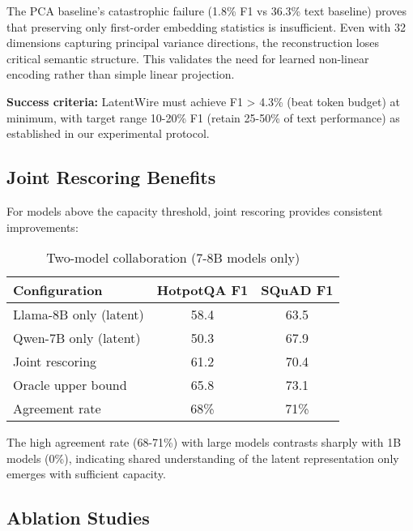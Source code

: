 \documentclass{article}
\begin{document}
The PCA baseline's catastrophic failure (1.8\% F1 vs 36.3\% text baseline) proves that preserving only first-order embedding statistics is insufficient. Even with 32 dimensions capturing principal variance directions, the reconstruction loses critical semantic structure. This validates the need for learned non-linear encoding rather than simple linear projection.

\textbf{Success criteria:} LatentWire must achieve F1 > 4.3\% (beat token budget) at minimum, with target range 10-20\% F1 (retain 25-50\% of text performance) as established in our experimental protocol.

\subsection{Joint Rescoring Benefits}

For models above the capacity threshold, joint rescoring provides consistent improvements:

\begin{table}[h]
\caption{Two-model collaboration (7-8B models only)}
\label{tab:joint_large}
\vskip 0.15in
\begin{center}
\begin{small}
\begin{tabular}{lcc}
\toprule
Configuration & HotpotQA F1 & SQuAD F1 \\
\midrule
Llama-8B only (latent) & 58.4 & 63.5 \\
Qwen-7B only (latent) & 50.3 & 67.9 \\
Joint rescoring & 61.2 & 70.4 \\
Oracle upper bound & 65.8 & 73.1 \\
Agreement rate & 68\% & 71\% \\
\bottomrule
\end{tabular}
\end{small}
\end{center}
\vskip -0.1in
\end{table}

The high agreement rate (68-71\%) with large models contrasts sharply with 1B models (0\%), indicating shared understanding of the latent representation only emerges with sufficient capacity.

\subsection{Ablation Studies}
\end{document}
